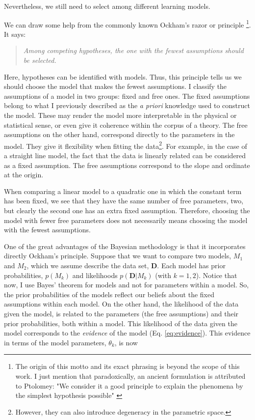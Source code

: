 Nevertheless, we still need to select among different learning models.  

We can draw some help from the commonly known Ockham's razor or principle \footnote{The origin of this motto and its exact phrasing is beyond the scope of this work. I just mention that paradoxically, an ancient formulation is attributed to Ptolomey: "We consider it a good principle to explain the phenomena by the simplest hypothesis possible" \citep{Franklin2002}}. It says:
\begin{quotation}
\textit{Among competing hypotheses, the one with the fewest assumptions should be selected.}
\end{quotation}

Here, hypotheses can be identified with models. Thus, this principle tells us we should choose the model that makes the fewest assumptions. I classify the assumptions of a model in two groups: fixed and free ones. The fixed assumptions belong to what I previously described as the \emph{a priori} knowledge used to construct the model. These may render the model more interpretable in the physical or statistical sense, or even give it coherence within the corpus of a theory. The free assumptions on the other hand, correspond directly to the parameters in the model. They give it flexibility when fitting the data\footnote{However, they can also introduce degeneracy in the parametric space.}. For example, in the case of a straight line model, the fact that the data is linearly related can be considered as a fixed assumption. The free assumptions correspond to the slope and ordinate at the origin. 

When comparing a linear model to a quadratic one in which the constant term has been fixed, we see that they have the same number of free parameters, two, but clearly the second one has an extra fixed assumption. Therefore, choosing the model with fewer free parameters does not necessarily means choosing the model with the fewest assumptions.

One of the great advantages of the Bayesian methodology is that it incorporates directly Ockham's principle. Suppose that we want to compare two models, $M_1$ and $M_2$, which we assume describe the data set, $\mathbf{D}$. Each model has prior probabilities, $p(M_k)$ and likelihoods $p(\mathbf{D}|M_k)$ (with $k=1,2$). Notice that now, I use Bayes' theorem for models and not for parameters within a model. So, the prior probabilities of the models reflect our beliefs about the fixed assumptions within each model. On the other hand, the likelihood of the data given the model, is related to the parameters (the free assumptions) and their prior probabilities, both within a model. This likelihood of the data given the model corresponds to the \emph{evidence} of the model (Eq. \ref{eq:evidence}). This evidence in terms of the model parameters, $\theta_k$, is now


